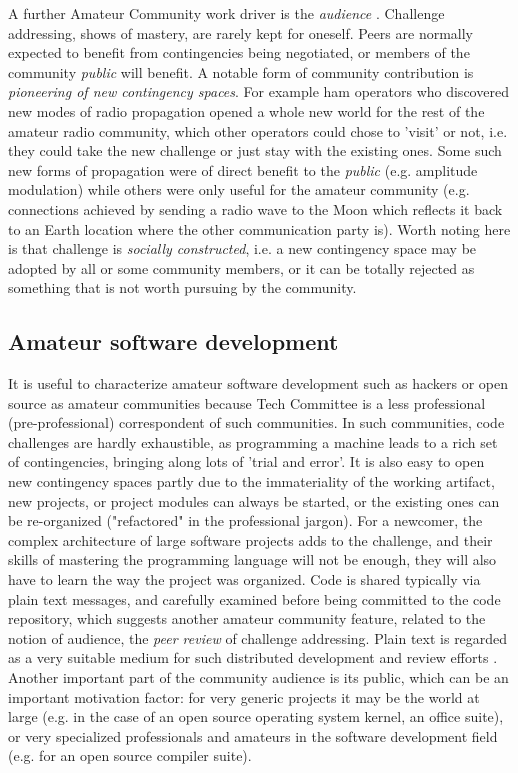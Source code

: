 \documentclass{sig-alt-release2}
\begin{document}
A further Amateur Community work driver is the \textit{audience} \cite{bogdan03}. Challenge addressing, shows of mastery, are rarely kept for oneself. %
Peers are normally expected to benefit from contingencies being negotiated, or members of the community \textit{public} will benefit. A notable form of community contribution is \textit{pioneering of new contingency spaces}.  For example ham operators who discovered new modes of radio propagation opened a whole new world for the rest of the amateur radio community, which other operators could chose to 'visit' or not, i.e. they could take the new challenge or just stay with the existing ones. Some such new forms of propagation were of direct benefit to the \textit{public}  (e.g. amplitude modulation) while others were only useful for the amateur community (e.g. connections achieved by sending a radio wave to the Moon which reflects it back to an Earth location where the other communication party is). Worth noting here is that challenge is \textit{socially constructed}, i.e. a new contingency space may be adopted by all or some community members, or it can be totally rejected as something that is not worth pursuing by the community.

\subsection{Amateur software development}\label{sec:amateur_devel}
It is useful to characterize amateur software development such as hackers \cite{levy94} or open source \cite{kollock99} as amateur communities 
because Tech Committee is a less professional (pre-professional) correspondent of such communities. 
In such communities, code challenges are hardly exhaustible, as programming a machine leads to a rich set of contingencies, bringing along lots of 'trial and error'. 
It is also easy to open new contingency spaces partly due to the immateriality of the working artifact, new projects, or project modules can always be started, or the existing ones can be re-organized ("refactored" in the professional jargon). For a newcomer, the complex architecture of large software projects adds to the challenge, and their skills of mastering the programming language will not be enough, they will also have to learn the way the project was organized.
Code is shared typically via plain text messages, and carefully examined before being committed to the code repository, which suggests another amateur community feature, related to the notion of audience, the \textit{peer review} of challenge addressing. 
Plain text is regarded as a very suitable medium for such distributed development and review efforts \cite{yamauchi00}. 
Another important part of the community audience is its public, which can be an important motivation factor: for very generic projects it may be the world at large (e.g. in the case of an open source operating system kernel, an office suite), or very specialized professionals and amateurs in the software development field (e.g. for an open source compiler suite).
\end{document}
